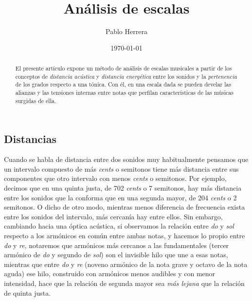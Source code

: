 \documentclass[a4paper,12pt]{article}
\begin{document}
\title{Análisis de escalas}
\author{Pablo Herrera}
\date{\today}
\maketitle
\begin{abstract}
El presente artículo expone un método de análisis de escalas musicales a partir de los conceptos de \emph{distancia acústica} y \emph{distancia energética} entre los sonidos y la \emph{pertenencia} de los grados respecto a una tónica. Con él, en una escala dada se pueden develar las alianzas y las tensiones internas entre notas que perfilan características de las músicas surgidas de ella.
\end{abstract}
\tableofcontents
\begin{multicols}{2}
\section{Distancias}\label{sec:distancias}

  Cuando se habla de distancia entre dos sonidos muy habitualmente pensamos que un intervalo compuesto de más \emph{cents} o semitonos tiene más distancia entre sus componentes que otro intervalo con menos \emph{cents} o semitonos. Por ejemplo, decimos que en una quinta justa, de 702 \emph{cents} o 7 semitonos, hay más distancia entre los sonidos que la conforma que en una segunda mayor, de 204 \emph{cents} o 2 semitonos. O dicho de otro modo, mientras menos diferencia de frecuencia exista entre los sonidos del intervalo, más cercanía hay entre ellos. Sin embargo, cambiando hacia una óptica acústica, si observamos la relación entre \emph{do} y \emph{sol} respecto a los armónicos en común entre ambas notas, y hacemos lo propio entre \emph{do} y \emph{re}, notaremos que armónicos más cercanos a las fundamentales (tercer armónico de \emph{do} y segundo de \emph{sol}) son el invisible hilo que une a esas notas, mientras que entre \emph{do} y \emph{re} (noveno armónico de la nota grave y octavo de la nota aguda) ese hilo, construido con armónicos menos audibles y con menor intensidad, hace que la relación de segunda mayor sea \emph{más lejana} que la relación de quinta justa.


\end{multicols}
\end{document}

